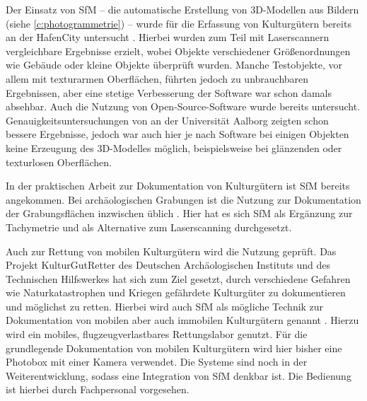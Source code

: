 \documentclass[./00PhotoBox]{subfiles}
\begin{document}
Der Einsatz von \acrfull{SfM} -- die automatische Erstellung von 3D-Modellen aus Bildern (siehe \autoref{c:photogrammetrie}) -- wurde für die Erfassung von Kulturgütern bereits \citeyear{kersten2012} an der HafenCity untersucht \citep[vgl.][]{kersten2012}. Hierbei wurden zum Teil mit Laserscannern vergleichbare Ergebnisse erzielt, wobei Objekte verschiedener Größenordnungen wie Gebäude oder kleine Objekte überprüft wurden. Manche Testobjekte, vor allem mit texturarmen Oberflächen, führten jedoch zu unbrauchbaren Ergebnissen, aber eine stetige Verbesserung der Software war schon damals absehbar. Auch die Nutzung von Open-Source-Software wurde bereits untersucht. Genauigkeitsuntersuchungen von \citet{IvanNikolov} an der Universität Aalborg zeigten schon bessere Ergebnisse, jedoch war auch hier je nach Software bei einigen Objekten keine Erzeugung des 3D-Modelles möglich, beispielsweise bei glänzenden oder texturlosen Oberflächen.

In der praktischen Arbeit zur Dokumentation von Kulturgütern ist \acrfull{SfM} bereits angekommen. Bei archäologischen Grabungen ist die Nutzung zur Dokumentation der Grabungsflächen inzwischen üblich \citep[vgl.][]{grabungen_sfm}. Hier hat es sich \Gls{SfM} als Ergänzung zur Tachymetrie und als Alternative zum Laserscanning durchgesetzt.

Auch zur Rettung von mobilen Kulturgütern wird die Nutzung geprüft. Das Projekt KulturGutRetter des Deutschen Archäologischen Instituts und des Technischen Hilfswerkes hat sich zum Ziel gesetzt, durch verschiedene Gefahren wie Naturkatastrophen und Kriegen gefährdete Kulturgüter zu dokumentieren und möglichst zu retten. Hierbei wird auch \Gls{SfM} als mögliche Technik zur Dokumentation von mobilen aber auch immobilen Kulturgütern genannt \citep[vgl.][S. 48]{kgr_article}. Hierzu wird ein mobiles, flugzeugverlastbares Rettungslabor genutzt. Für die grundlegende Dokumentation von mobilen Kulturgütern wird hier bisher eine Photobox mit einer Kamera verwendet. Die Systeme sind noch in der Weiterentwicklung, sodass eine Integration von \Gls{SfM} denkbar ist. Die Bedienung ist hierbei durch Fachpersonal vorgesehen. \citep[vgl.][]{kulturgutretter}

\biblio
\end{document}
